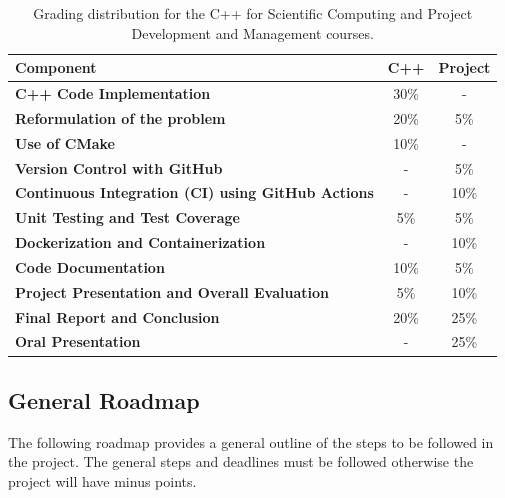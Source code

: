\documentclass[english,10pt,a4paper]{article}
\begin{document}
\begin{table}[h!]
    \centering
    \begin{tabular}{lcc}
    \toprule
    \textbf{Component}                               & \textbf{C++} & \textbf{Project} \\ \midrule
    \textbf{C++ Code Implementation}                              & 30\%                 & -             \\
    \textbf{Reformulation of the problem}                         & 20\%                 & 5\%          \\
    \textbf{Use of CMake}                                         & 10\%                 & -             \\
    \textbf{Version Control with GitHub}                          & -                    & 5\%          \\
    \textbf{Continuous Integration (CI) using GitHub Actions}     & -                    & 10\%          \\
    \textbf{Unit Testing and Test Coverage}                       & 5\%                  & 5\%          \\
    \textbf{Dockerization and Containerization}                   & -                    & 10\%          \\
    \textbf{Code Documentation}                                   & 10\%                 & 5\%          \\
    \textbf{Project Presentation and Overall Evaluation}          & 5\%                 & 10\%          \\
    \textbf{Final Report and Conclusion}                          & 20\%                 & 25\%          \\
    \textbf{Oral Presentation}                                    & -                    & 25\%          \\
    \bottomrule
    \end{tabular}
    \caption{Grading distribution for the C++ for Scientific Computing and Project Development and Management courses.}
\end{table}

\subsection{General Roadmap}

The following roadmap provides a general outline of the steps to be followed in the project. 
The general steps and deadlines must be followed otherwise the project will have minus points.
\end{document}
